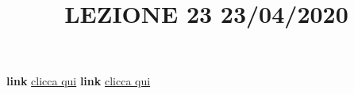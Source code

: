 \newline
\newline
\title{LEZIONE 23 23/04/2020}\newline
\textbf{link} \href{https://web.microsoftstream.com/video/bd31a95d-d362-4a85-aa83-b7ab7f69410b?list=user&userId=faa91214-a6f5-40d7-8875-253fd49b8ce1}{clicca qui}\newline
\textbf{link} \href{https://web.microsoftstream.com/video/29d20378-4396-426e-9cc1-c7bdaa69554c?list=user&userId=faa91214-a6f5-40d7-8875-253fd49b8ce1}{clicca qui}